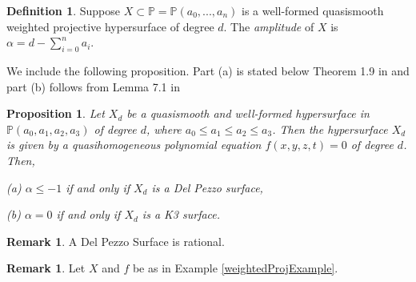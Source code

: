 \documentclass[12pt]{amsart}
\theoremstyle{plain}
\newtheorem{proposition}[subsection]{Proposition}
\theoremstyle{definition}
\newtheorem{definition}[subsection]{Definition}
\newtheorem{remark}[subsection]{Remark}
\newcommand{\proj}{\ensuremath{\mathbb{P}}}
\begin{document}
\begin{definition}
	Suppose $X \subset \proj = \proj(a_0, ..., a_n)$ is a well-formed quasismooth weighted projective hypersurface of degree $d$. The \textit{amplitude} of $X$ is $\alpha = d - \sum\limits_{i=0}^n a_i$.    
\end{definition}

We include the following proposition. Part (a) is stated below Theorem 1.9 in \cite{Cheltsov2010} and part (b) follows from Lemma 7.1 in \cite{iano-fletcher_2000}

\begin{proposition}
	Let $X_d$ be a quasismooth and well-formed hypersurface in $\proj(a_0,a_1,a_2,a_3)$ of degree
	$d$, where $a_0 \leq a_1 \leq  a_2 \leq a_3$. Then the hypersurface $X_d$ is given by a quasihomogeneous
	polynomial equation $f(x,y,z,t) = 0$ of degree $d$. Then,  
	
	(a) $\alpha \leq -1$ if and only if $X_d$ is a Del Pezzo surface, 
	
	(b) $\alpha = 0$ if and only if $X_d$ is a K3 surface.
\end{proposition}

\begin{remark} A Del Pezzo Surface is rational. 
\end{remark}

\begin{remark} Let $X$ and $f$ be as in Example \ref{weightedProjExample}. 
\end{remark}


        








\end{document}
